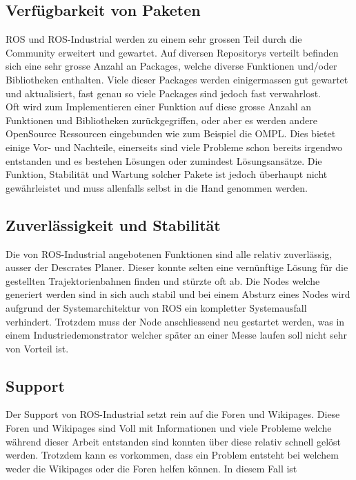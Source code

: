 \subsection{Verfügbarkeit von Paketen}
ROS und ROS-Industrial werden zu einem sehr grossen Teil durch die Community erweitert und gewartet. Auf diversen Repositorys verteilt befinden sich eine sehr grosse Anzahl an Packages, welche diverse Funktionen und/oder Bibliotheken enthalten. Viele dieser Packages werden einigermassen gut gewartet und aktualisiert, fast genau so viele Packages sind jedoch fast verwahrlost.\\
Oft wird zum Implementieren einer Funktion auf diese grosse Anzahl an Funktionen und Bibliotheken zurückgegriffen, oder aber es werden andere OpenSource Ressourcen eingebunden wie zum Beispiel die OMPL. Dies bietet einige Vor- und Nachteile, einerseits sind viele Probleme schon bereits irgendwo entstanden und es bestehen Lösungen oder zumindest Lösungsansätze. Die Funktion, Stabilität und Wartung solcher Pakete ist jedoch überhaupt nicht gewährleistet und muss allenfalls selbst in die Hand genommen werden.

\subsection{Zuverlässigkeit und Stabilität}
Die von ROS-Industrial angebotenen Funktionen sind alle relativ zuverlässig, ausser der Descrates Planer. Dieser konnte selten eine vernünftige Lösung für die gestellten Trajektorienbahnen finden und stürzte oft ab. Die Nodes welche generiert werden sind in sich auch stabil und bei einem Absturz eines Nodes wird aufgrund der Systemarchitektur von ROS ein kompletter Systemausfall verhindert. Trotzdem muss der Node anschliessend neu gestartet werden, was in einem Industriedemonstrator welcher später an einer Messe laufen soll nicht sehr von Vorteil ist. 

\subsection{Support}
Der Support von ROS-Industrial setzt rein auf die Foren und Wikipages. Diese Foren und Wikipages sind Voll mit Informationen und viele Probleme welche während dieser Arbeit entstanden sind konnten über diese relativ schnell gelöst werden. Trotzdem kann es vorkommen, dass ein Problem entsteht bei welchem weder die Wikipages oder die Foren helfen können. In diesem Fall ist 

